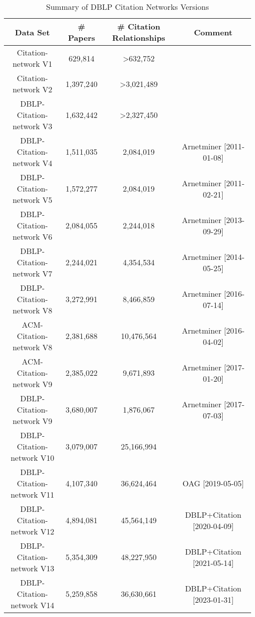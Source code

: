 \documentclass[11pt]{article}
\begin{document}
\begin{table*}[h!] 
	\centering
	\begin{tabular}{|c|c|c|c|}
		\hline
		\textbf{Data Set}         & \textbf{\# Papers} & \textbf{\# Citation Relationships} & \textbf{Comment}           \\
		\hline
		Citation-network V1       & 629,814            & >632,752                           &                            \\
		Citation-network V2       & 1,397,240          & >3,021,489                         &                            \\
		DBLP-Citation-network V3  & 1,632,442          & >2,327,450                         &                            \\
		DBLP-Citation-network V4  & 1,511,035          & 2,084,019                          & Arnetminer [2011-01-08]    \\
		DBLP-Citation-network V5  & 1,572,277          & 2,084,019                          & Arnetminer [2011-02-21]    \\
		DBLP-Citation-network V6  & 2,084,055          & 2,244,018                          & Arnetminer [2013-09-29]    \\
		DBLP-Citation-network V7  & 2,244,021          & 4,354,534                          & Arnetminer [2014-05-25]    \\
		DBLP-Citation-network V8  & 3,272,991          & 8,466,859                          & Arnetminer [2016-07-14]    \\
		ACM-Citation-network V8   & 2,381,688          & 10,476,564                         & Arnetminer [2016-04-02]    \\
		ACM-Citation-network V9   & 2,385,022          & 9,671,893                          & Arnetminer [2017-01-20]    \\
		DBLP-Citation-network V9  & 3,680,007          & 1,876,067                          & Arnetminer [2017-07-03]    \\
		DBLP-Citation-network V10 & 3,079,007          & 25,166,994                         &                            \\
		DBLP-Citation-network V11 & 4,107,340          & 36,624,464                         & OAG [2019-05-05]           \\
		DBLP-Citation-network V12 & 4,894,081          & 45,564,149                         & DBLP+Citation [2020-04-09] \\
		DBLP-Citation-network V13 & 5,354,309          & 48,227,950                         & DBLP+Citation [2021-05-14] \\
		DBLP-Citation-network V14 & 5,259,858          & 36,630,661                         & DBLP+Citation [2023-01-31] \\
		\hline
	\end{tabular}
	\caption{Summary of DBLP Citation Networks Versions}
	\label{tab:dblp_citation_networks}
\end{table*}
\end{document}
